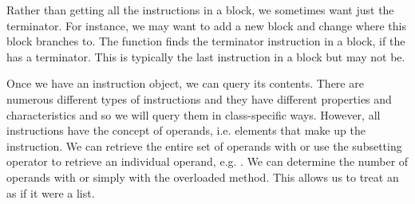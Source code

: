 \begin{comment}
Each element returned appears in \R{} as a generic
\Rclass{Instruction} object. 
This means that we can 
We can determine the nature of an
instruction by examing its ``op code'' with the function
\Rfunc{getOpcode}.  This returns a named integer value. The name tells
is the human-readable type while the integer is the enumeration
constant used in \Cpp.
For example, in our \Cfunc{v_dnorm} routine,
we can retrieve the op codes for the instructions
in the block  that implements the body of the \Ckeyword{for} loop with
\begin{RCode}
block = getBlocks(vfun$fun)[['for.body']]
sapply(block[], getOpcode)
\end{RCode}
The result is
\begin{ROutput}
         load          sext          load getelementptr 
           27            35            27            29 
         load          load          load          call 
           27            27            27            48 
         load          sext          load getelementptr 
           27            35            27            29 
        store          load           add         store 
           28            27             8            28 
           br 
            2 
\end{ROutput} 
We can coerce the generic \Rclass{Instruction} object to a more 
specific class using \Rfunc{as}.
For example, the fourth instruction has an op code 
named \texttt{getelementptr}. This corresponds to the
\Rclass{GetElementPtrInst} class in \R.
\begin{RCode}
as(b[[4]], 'GetElementPtrInst')
\end{RCode}
\end{comment}


Rather than getting all the instructions in a block, we sometimes want
just the terminator.  For instance, we may want to add a new block and
change where this block branches to.  The function
 finds the terminator instruction in a block, if
the  has a terminator.  This is typically the last
instruction in a block but may not be.


Once we have an instruction object, we can query its contents. There
are numerous different types of instructions and they have different
properties and characteristics and so we will query them in
class-specific ways.  However, all instructions have the concept of
operands, i.e. elements that make up the instruction.  We can retrieve
the entire set of operands with  or use the
subsetting operator to retrieve an individual operand, e.g.
.  We can determine the number of operands with
 or simply with the overloaded 
method.  This allows us to treat an  as if it were
a list.


